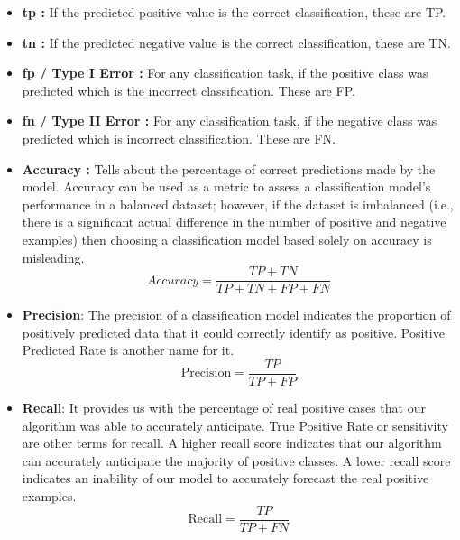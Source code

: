 \begin{itemize}
    \item \textbf{\acrfull{tp} : } If the predicted positive value is the correct classification, these are TP.
    \item \textbf{\acrfull{tn} : }  If the predicted negative value is the correct classification, these are TN.
    \item \textbf{\acrfull{fp} / Type I Error : } For any classification task, if the positive class was predicted which is the incorrect classification. These are FP.
    \item \textbf{\acrfull{fn} / Type II Error : } For any classification task, if the negative class was predicted which is incorrect classification. These are FN.
    \item \textbf{Accuracy : } Tells about the percentage of correct predictions made by the model. Accuracy can be used as a metric to assess a classification model's performance in a balanced dataset; however, if the dataset is imbalanced (i.e., there is a significant actual difference in the number of positive and negative examples) then choosing a classification model based solely on accuracy is misleading.
    \begin{equation}
        Accuracy = \frac{TP + TN}{TP + TN + FP + FN}
    \end{equation}
    \item \textbf{Precision}: The precision of a classification model indicates the proportion of positively predicted data that it could correctly identify as positive. Positive Predicted Rate is another name for it.
    \begin{equation}
        \text{Precision} = \frac{TP}{TP + FP}
    \end{equation}
    
    \item \textbf{Recall}: It provides us with the percentage of real positive cases that our algorithm was able to accurately anticipate. True Positive Rate or sensitivity are other terms for recall. A higher recall score indicates that our algorithm can accurately anticipate the majority of positive classes. A lower recall score indicates an inability of our model to accurately forecast the real positive examples.
    \begin{equation}
        \text{Recall} = \frac{TP}{TP + FN}
    \end{equation}
    

\end{itemize}
